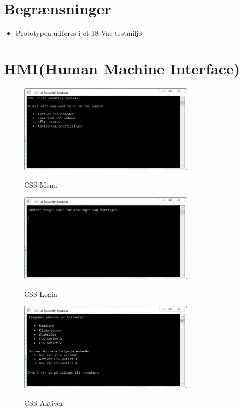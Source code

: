 \section{Begrænsninger}
\begin{itemize}
\item Prototypen udføres i et 18 Vac testmiljø
\end{itemize}

\newpage
\section{HMI(Human Machine Interface)}

\begin{figure}[h] \centering
{\includegraphics[width=0.75\textwidth]{billeder/cmdprompt/CSS_menu}}
\caption{CSS Menu}
\end{figure}

\begin{figure}[h] \centering
{\includegraphics[width=0.75\textwidth]{billeder/cmdprompt/CSS_login}}
\caption{CSS Login}
\end{figure}

\begin{figure}[h] \centering
{\includegraphics[width=0.75\textwidth]{billeder/cmdprompt/CSS_aktiver}}
\caption{CSS Aktiver}
\end{figure}

